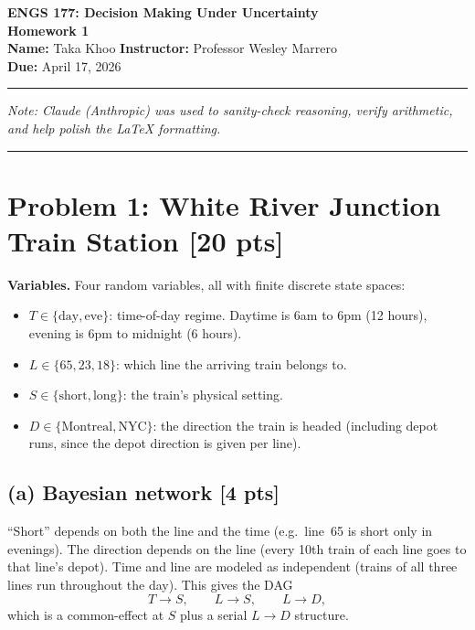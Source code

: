 \documentclass[12pt]{article}
\begin{document}
\begin{center}
  {\LARGE \textbf{ENGS 177: Decision Making Under Uncertainty}}\\[0.35em]
  {\Large \textbf{Homework 1}}\\[0.25em]
  \textbf{Name:} Taka Khoo \quad\textbullet\quad \textbf{Instructor:} Professor Wesley Marrero\\[0.25em]
  \textbf{Due:} April 17, 2026
\end{center}
\hrule
\vspace{0.25em}

\footnotesize\textit{Note: Claude (Anthropic) was used to sanity-check reasoning, verify arithmetic, and help polish the \LaTeX{} formatting.}
\normalsize
\vspace{0.5em}
\hrule
\vspace{0.75em}

\section*{Problem 1: White River Junction Train Station \hfill [20 pts]}

\textbf{Variables.} Four random variables, all with finite discrete state spaces:
\begin{itemize}[leftmargin=1.5em,itemsep=1pt]
  \item $T\in\{\text{day},\text{eve}\}$: time-of-day regime. Daytime is 6am to 6pm (12 hours), evening is 6pm to midnight (6 hours).
  \item $L\in\{65,23,18\}$: which line the arriving train belongs to.
  \item $S\in\{\text{short},\text{long}\}$: the train's physical setting.
  \item $D\in\{\text{Montreal},\text{NYC}\}$: the direction the train is headed (including depot runs, since the depot direction is given per line).
\end{itemize}

\subsection*{(a) Bayesian network [4 pts]}

``Short'' depends on both the line and the time (e.g.\ line~65 is short only in evenings). The direction depends on the line (every 10th train of each line goes to that line's depot). Time and line are modeled as independent (trains of all three lines run throughout the day). This gives the DAG
\[
  T\to S,\qquad L\to S,\qquad L\to D,
\]
which is a common-effect at $S$ plus a serial $L\to D$ structure.
\end{document}
